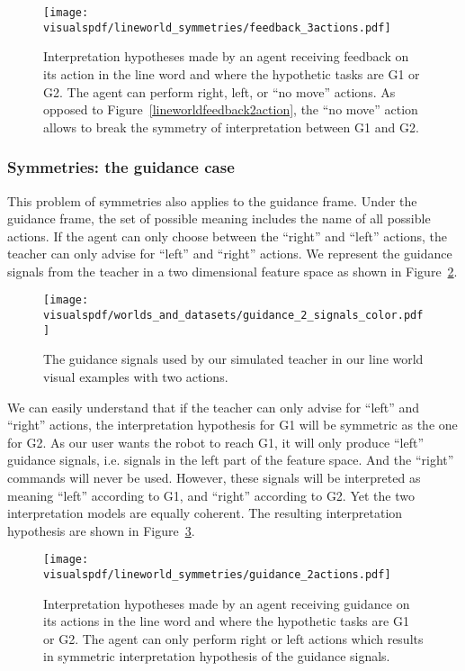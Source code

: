 \begin{figure}[!htbp]
  \centering
  \texttt{[image: \\visualspdf/lineworld\_symmetries/feedback\_3actions.pdf]}
  \caption{Interpretation hypotheses made by an agent receiving feedback on its action in the line word and where the hypothetic tasks are G1 or G2. The agent can perform right, left, or ``no move'' actions. As opposed to Figure~\ref{lineworldfeedback2action}, the ``no move'' action allows to break the symmetry of interpretation between G1 and G2.}
  \label{fig:lineworldfeedback3action}
\end{figure}

\subsubsection*{Symmetries: the guidance case}

This problem of symmetries also applies to the guidance frame. Under the guidance frame, the set of possible meaning includes the name of all possible actions. If the agent can only choose between the ``right'' and ``left'' actions, the teacher can only advise for ``left'' and ``right'' actions. We represent the guidance signals from the teacher in a two dimensional feature space as shown in Figure~\ref{fig:lineworldguidance2signals}.

\begin{figure}[!htbp]
  \centering
  \texttt{[image: \\visualspdf/worlds\_and\_datasets/guidance\_2\_signals\_color.pdf]}
  \caption{The guidance signals used by our simulated teacher in our line world visual examples with two actions.}
  \label{fig:lineworldguidance2signals}
\end{figure}


We can easily understand that if the teacher can only advise for ``left'' and ``right'' actions, the interpretation hypothesis for G1 will be symmetric as the one for G2. As our user wants the robot to reach G1, it will only produce ``left'' guidance signals, i.e. signals in the left part of the feature space. And the ``right'' commands will never be used. However, these signals will be interpreted as meaning ``left'' according to G1, and ``right'' according to G2. Yet the two interpretation models are equally coherent. The resulting interpretation hypothesis are shown in Figure~\ref{fig:lineworldguidance2action}.

\begin{figure}[!htbp]
  \centering
  \texttt{[image: \\visualspdf/lineworld\_symmetries/guidance\_2actions.pdf]}
  \caption{Interpretation hypotheses made by an agent receiving guidance on its actions in the line word and where the hypothetic tasks are G1 or G2. The agent can only perform right or left actions which results in symmetric interpretation hypothesis of the guidance signals.}
  \label{fig:lineworldguidance2action}
\end{figure}

